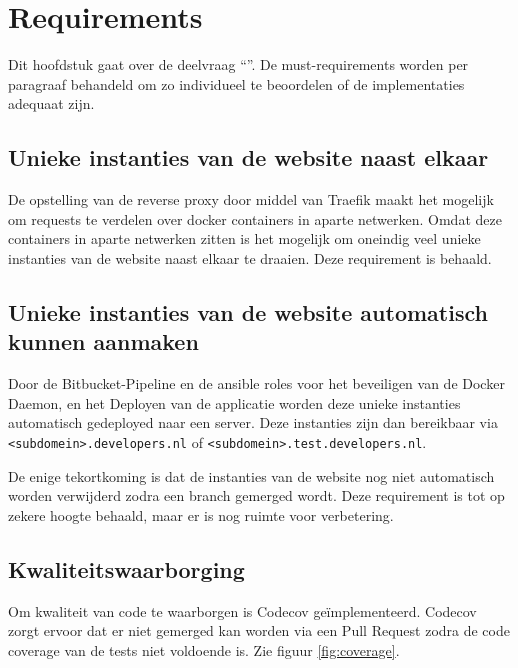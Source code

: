 \chapter{Requirements}

\label{Chapter7}

Dit hoofdstuk gaat over de deelvraag \enquote{\deelrequirements}. De must-requirements worden per paragraaf behandeld om zo individueel te beoordelen of de implementaties adequaat zijn.

\section{Unieke instanties van de website naast elkaar}
De opstelling van de reverse proxy door middel van Traefik maakt het mogelijk om requests te verdelen over docker containers in aparte netwerken. Omdat deze containers in aparte netwerken zitten is het mogelijk om oneindig veel unieke instanties van de website naast elkaar te draaien. Deze requirement is behaald.

\section{Unieke instanties van de website automatisch kunnen aanmaken}
Door de Bitbucket-Pipeline en de ansible roles voor het beveiligen van de Docker Daemon, en het Deployen van de applicatie worden deze unieke instanties automatisch gedeployed naar een server. Deze instanties zijn dan bereikbaar via \texttt{<subdomein>.developers.nl} of \texttt{<subdomein>.test.developers.nl}.

De enige tekortkoming is dat de instanties van de website nog niet automatisch worden verwijderd zodra een branch gemerged wordt. Deze requirement is tot op zekere hoogte behaald, maar er is nog ruimte voor verbetering.

\section{Kwaliteitswaarborging}
Om kwaliteit van code te waarborgen is Codecov geïmplementeerd. Codecov zorgt ervoor dat er niet gemerged kan worden via een Pull Request zodra de code coverage van de tests niet voldoende is. Zie figuur \ref{fig:coverage}.

